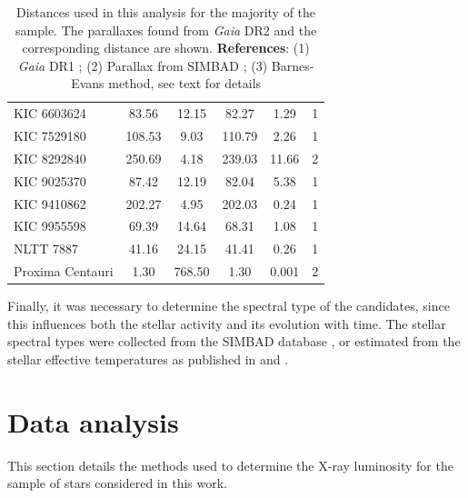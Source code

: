 \begin{table}[t]
{\begin{tabular}{lccccc}
KIC 6603624      & 83.56         & 12.15                  & 82.27                  & 1.29       & 1                 \\
KIC 7529180      & 108.53        & 9.03                   & 110.79                 & 2.26       & 1                 \\
KIC 8292840      & 250.69        & 4.18                   & 239.03                 & 11.66      & 2                 \\
KIC 9025370      & 87.42         & 12.19                  & 82.04                  & 5.38       & 1                 \\
KIC 9410862      & 202.27        & 4.95                   & 202.03                 & 0.24       & 1                 \\
KIC 9955598      & 69.39         & 14.64                  & 68.31                  & 1.08       & 1                 \\
NLTT 7887        & 41.16         & 24.15                  & 41.41                  & 0.26       & 1                 \\
Proxima Centauri & 1.30          & 768.50                 & 1.30                   & 0.001      & 2                 \\
\hline
\end{tabular}}
\caption[Comparison of distances to \textit{Gaia} DR2]{Distances used in this analysis for the majority of the sample. The parallaxes found from \textit{Gaia} DR2 and the corresponding distance are shown. \textbf{References}: (1) \textit{Gaia} DR1 \citep{Gaia_Collaboration_2016_DR1}; (2) Parallax from SIMBAD \citep{Wenger_etal_2000}; (3) Barnes-Evans method, see text for details}
\label{Table:distance_comparison}
\end{table}

Finally, it was necessary to determine the spectral type of the candidates, since this influences both the stellar activity and its evolution with time. The stellar spectral types were collected from the SIMBAD database \citep{Wenger_etal_2000}, or estimated from the stellar effective temperatures as published in \citet{Chaplin_etal_2014} and \citet{Silva_Aguirre_etal_2015}.

\section{Data analysis}
This section details the methods used to determine the X-ray luminosity for the sample of stars considered in this work.

